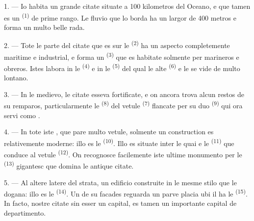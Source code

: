 
\VUsaut{2.0mm}
\VUsaut{3.0mm}
\VUfilet{16mm}
\VUsaut{5.6mm}
\VUsaut{1.4mm}
\VUsaut{2.2mm}

\VUsaut{3.0mm}

1. --- Io habita un grande citate situate a 100 kilometros del Oceano, e que
tamen es un  \textsuperscript{(1)} de prime rango. Le fluvio que
lo borda ha un largor de 400 metros e forma un multo belle rada.

2. --- Tote le parte del citate que es sur le 
\textsuperscript{(2)} ha un aspecto completemente maritime e industrial, e forma
un  \textsuperscript{(3)} que es habitate solmente per
marineros e obreros. Istes labora in le  \textsuperscript{(4)}
e in le  \textsuperscript{(5)} del qual le alte
 \textsuperscript{(6)} e le  se vide de multo
lontano.

3. --- In le medievo, le citate esseva fortificate, e on ancora trova alcun
restos de su remparos, particularmente le  \textsuperscript{(8)}
del vetule  \textsuperscript{(7)} flancate per su
duo  \textsuperscript{(9)} qui ora servi como .

4. --- In tote iste , que pare multo vetule, solmente un
construction es relativemente moderne: illo es le 
\textsuperscript{(10)}. Illo es situate inter le quai e le 
\textsuperscript{(11)} que conduce al vetule 
\textsuperscript{(12)}. On recognosce facilemente iste ultime monumento per le
 \textsuperscript{(13)} gigantesc que domina le antique
citate.

5. --- Al altere latere del strata,  un edificio construite in le
mesme stilo que le dogana: illo es le  \textsuperscript{(14)}. Un
de su facades reguarda un parve placia ubi il ha le 
\textsuperscript{(15)}. In facto, nostre citate sin esser un capital, es tamen
un importante capital de departimento.

